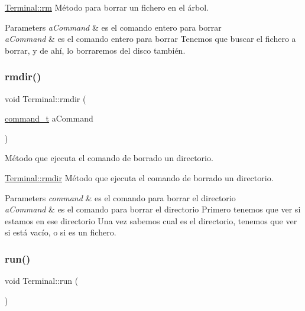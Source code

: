 \hyperlink{classTerminal_aa87d8e5d00abd8fc52d8c5e93439ae9a}{Terminal\+::rm} Método para borrar un fichero en el árbol.


\begin{DoxyParams}{Parameters}
{\em a\+Command} & es el comando entero para borrar\\
\hline
{\em a\+Command} & es el comando entero para borrar Tenemos que buscar el fichero a borrar, y de ahí, lo borraremos del disco también. \\
\hline
\end{DoxyParams}
\mbox{\label{classTerminal_a95f79cc087e60f292ab95ae7950c40f9}} 
\subsubsection{\texorpdfstring{rmdir()}{rmdir()}}
{\footnotesize\ttfamily void Terminal\+::rmdir (\begin{DoxyParamCaption}\item[{\hyperlink{structcommand__t}{command\+\_\+t}}]{a\+Command }\end{DoxyParamCaption})}



Método que ejecuta el comando de borrado un directorio. 

\hyperlink{classTerminal_a95f79cc087e60f292ab95ae7950c40f9}{Terminal\+::rmdir} Método que ejecuta el comando de borrado un directorio.


\begin{DoxyParams}{Parameters}
{\em command} & es el comando para borrar el directorio\\
\hline
{\em a\+Command} & es el comando para borrar el directorio Primero tenemos que ver si estamos en ese directorio Una vez sabemos cual es el directorio, tenemos que ver si está vacío, o si es un fichero. \\
\hline
\end{DoxyParams}
\mbox{\label{classTerminal_ac822276bd11e19db71d1b1410333c3c7}} 
\subsubsection{\texorpdfstring{run()}{run()}}
{\footnotesize\ttfamily void Terminal\+::run (\begin{DoxyParamCaption}{ }\end{DoxyParamCaption})}



